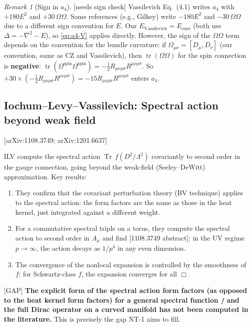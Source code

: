 \documentclass[12pt,a4paper]{article}
\theoremstyle{definition}
\theoremstyle{remark}
\newtheorem{remark}[proposition]{Remark}
\newcommand{\Tr}{\operatorname{Tr}}
\newcommand{\tr}{\operatorname{tr}}
\newcommand{\Rsq}{R_{\mu\nu\rho\sigma}R^{\mu\nu\rho\sigma}}
\newcommand{\fromlit}[1]{\textcolor{blue!70!black}{\textsf{[#1]}}}
\newcommand{\gap}{\textcolor{red!80!black}{\textsf{[GAP]}}}
\newcommand{\needscheck}{\textcolor{orange!80!black}{\textsf{[needs sign check]}}}
\begin{document}
\begin{remark}[Sign in $a_4$]
\needscheck\;
Vassilevich Eq.~(4.1) writes $a_4$ with $+180E^2$ and $+30\,\Omega\Omega$.
Some references (e.g., Gilkey) write $-180E^2$ and $-30\,\Omega\Omega$
due to a different sign convention for $E$.  Our
$E_{\text{Vassilevich}} = E_{\text{ours}}$ (both use $\Delta = -\nabla^2 - E$),
so \eqref{eq:a4-V} applies directly.
However, the sign of the $\Omega\Omega$ term depends on the convention
for the bundle curvature: if $\Omega_{\mu\nu} = [D_\mu,D_\nu]$
(our convention, same as CZ and Vassilevich), then
$\tr(\Omega\Omega)$ for the spin connection is \textbf{negative}:
$\tr(\Omega^{\text{spin}}\Omega^{\text{spin}}) = -\frac{1}{2}\Rsq$.
So $+30\times(-\frac{1}{2}\Rsq) = -15\Rsq$ enters $a_4$.
\end{remark}


\subsection{Iochum--Levy--Vassilevich: Spectral action beyond weak field}

\fromlit{arXiv:1108.3749; arXiv:1201.6637}

ILV compute the spectral action $\Tr\,f(D^2/\Lambda^2)$ covariantly
to second order in the gauge connection, going beyond the weak-field
(Seeley--DeWitt) approximation.  Key results:

\begin{enumerate}
\item They confirm that the covariant perturbation theory (BV technique)
applies to the spectral action: the form factors are the same as
those in the heat kernel, just integrated against a different weight.

\item For a commutative spectral triple on a torus, they compute
the spectral action to second order in $A_\mu$ and find
\fromlit{1108.3749 abstract}:
in the UV regime $p\to\infty$, the action decays as $1/p^4$ in any
even dimension.

\item The convergence of the nonlocal expansion is controlled by the
smoothness of $f$: for Schwartz-class $f$, the expansion converges
for all $\Box$.
\end{enumerate}

\gap\; \textbf{The explicit form of the spectral action form factors
(as opposed to the heat kernel form factors) for a general spectral
function $f$ and the full Dirac operator on a curved manifold has
not been computed in the literature.}  This is precisely the gap
NT-1 aims to fill.
\end{document}
